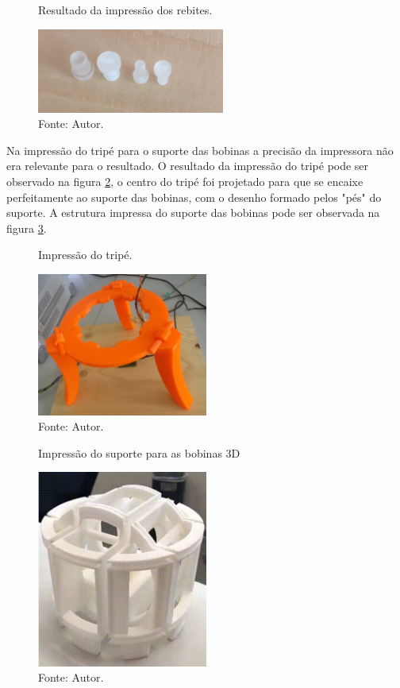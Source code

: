 \begin{figure}[H]
    \centering
     \caption{Resultado da impressão dos rebites.}
     \includegraphics[width=0.55\textwidth]{./img/impressoes3D/rebites.jpg}
     \caption*{Fonte: Autor.}\label{fig:rebim}
\end{figure}

Na impressão do tripé para o suporte das bobinas a precisão da impressora não era relevante para o resultado. O resultado da impressão do tripé pode ser observado na figura \ref{fig:tripim}, o centro do tripé foi projetado para que se encaixe perfeitamente ao suporte das bobinas, com o desenho formado pelos "pés" do suporte. A estrutura impressa do suporte das bobinas pode ser observada na figura \ref{fig:bob}.

\begin{figure}[H]
    \centering
     \caption{Impressão do tripé.}
     \includegraphics[width=0.5\textwidth]{./img/impressoes3D/tripe.jpg}
     \caption*{Fonte: Autor.}\label{fig:tripim}
\end{figure}

\begin{figure}[H]
    \centering
     \caption{Impressão do suporte para as bobinas 3D}
     \includegraphics[width=0.5\textwidth]{./img/impressoes3D/bobiba1.jpg}
     \caption*{Fonte: Autor.}\label{fig:bob}
\end{figure}

